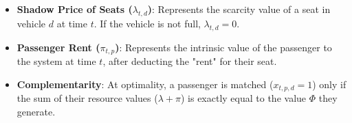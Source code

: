 \documentclass[12pt]{article}
\begin{document}
\begin{itemize}
    \item \textbf{Shadow Price of Seats ($\lambda_{t,d}$)}: Represents the scarcity value of a seat in vehicle $d$ at time $t$. If the vehicle is not full, $\lambda_{t,d} = 0$.
    \item \textbf{Passenger Rent ($\pi_{t,p}$)}: Represents the intrinsic value of the passenger to the system at time $t$, after deducting the "rent" for their seat.
    \item \textbf{Complementarity}: At optimality, a passenger is matched ($x_{t,p,d} = 1$) only if the sum of their resource values ($\lambda + \pi$) is exactly equal to the value $\Phi$ they generate.
\end{itemize}
\end{document}
